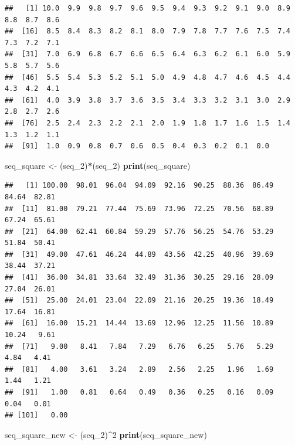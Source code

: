 \documentclass[]{book}
\newenvironment{Shaded}{\begin{snugshade}}{\end{snugshade}}
\newcommand{\DecValTok}[1]{\textcolor[rgb]{0.00,0.00,0.81}{#1}}
\newcommand{\KeywordTok}[1]{\textcolor[rgb]{0.13,0.29,0.53}{\textbf{#1}}}
\newcommand{\NormalTok}[1]{#1}
\newcommand{\OperatorTok}[1]{\textcolor[rgb]{0.81,0.36,0.00}{\textbf{#1}}}
\newcommand{\StringTok}[1]{\textcolor[rgb]{0.31,0.60,0.02}{#1}}
\begin{document}
\begin{verbatim}
##   [1] 10.0  9.9  9.8  9.7  9.6  9.5  9.4  9.3  9.2  9.1  9.0  8.9  8.8  8.7  8.6
##  [16]  8.5  8.4  8.3  8.2  8.1  8.0  7.9  7.8  7.7  7.6  7.5  7.4  7.3  7.2  7.1
##  [31]  7.0  6.9  6.8  6.7  6.6  6.5  6.4  6.3  6.2  6.1  6.0  5.9  5.8  5.7  5.6
##  [46]  5.5  5.4  5.3  5.2  5.1  5.0  4.9  4.8  4.7  4.6  4.5  4.4  4.3  4.2  4.1
##  [61]  4.0  3.9  3.8  3.7  3.6  3.5  3.4  3.3  3.2  3.1  3.0  2.9  2.8  2.7  2.6
##  [76]  2.5  2.4  2.3  2.2  2.1  2.0  1.9  1.8  1.7  1.6  1.5  1.4  1.3  1.2  1.1
##  [91]  1.0  0.9  0.8  0.7  0.6  0.5  0.4  0.3  0.2  0.1  0.0
\end{verbatim}

\begin{Shaded}
\begin{Highlighting}[]
\NormalTok{seq_square <-}\StringTok{ }\NormalTok{(seq_}\DecValTok{2}\NormalTok{)}\OperatorTok{*}\NormalTok{(seq_}\DecValTok{2}\NormalTok{)}
\KeywordTok{print}\NormalTok{(seq_square)}
\end{Highlighting}
\end{Shaded}

\begin{verbatim}
##   [1] 100.00  98.01  96.04  94.09  92.16  90.25  88.36  86.49  84.64  82.81
##  [11]  81.00  79.21  77.44  75.69  73.96  72.25  70.56  68.89  67.24  65.61
##  [21]  64.00  62.41  60.84  59.29  57.76  56.25  54.76  53.29  51.84  50.41
##  [31]  49.00  47.61  46.24  44.89  43.56  42.25  40.96  39.69  38.44  37.21
##  [41]  36.00  34.81  33.64  32.49  31.36  30.25  29.16  28.09  27.04  26.01
##  [51]  25.00  24.01  23.04  22.09  21.16  20.25  19.36  18.49  17.64  16.81
##  [61]  16.00  15.21  14.44  13.69  12.96  12.25  11.56  10.89  10.24   9.61
##  [71]   9.00   8.41   7.84   7.29   6.76   6.25   5.76   5.29   4.84   4.41
##  [81]   4.00   3.61   3.24   2.89   2.56   2.25   1.96   1.69   1.44   1.21
##  [91]   1.00   0.81   0.64   0.49   0.36   0.25   0.16   0.09   0.04   0.01
## [101]   0.00
\end{verbatim}

\begin{Shaded}
\begin{Highlighting}[]
\NormalTok{seq_square_new <-}\StringTok{ }\NormalTok{(seq_}\DecValTok{2}\NormalTok{)}\OperatorTok{^}\DecValTok{2}
\KeywordTok{print}\NormalTok{(seq_square_new)}
\end{Highlighting}
\end{Shaded}
\end{document}

